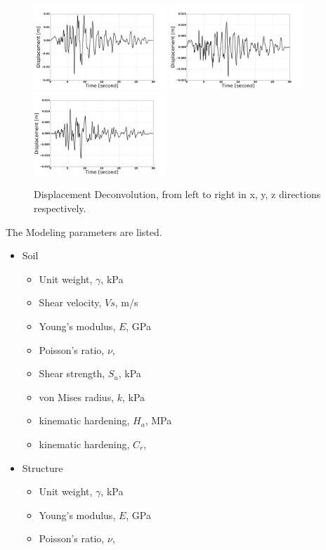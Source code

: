 \begin{figure}[H]
  \centering
  \includegraphics[width = 5cm]{./Figure-files/Day1/Nuclear_Power_Plant_with_3by1D_motions_from_Deconvolution/scaled_NORTHR_x_D.jpg}
  \includegraphics[width = 5cm]{./Figure-files/Day1/Nuclear_Power_Plant_with_3by1D_motions_from_Deconvolution/scaled_NORTHR_y_D.jpg}
  \includegraphics[width = 5cm]{./Figure-files/Day1/Nuclear_Power_Plant_with_3by1D_motions_from_Deconvolution/scaled_NORTHR_z_D.jpg}
  \caption{Displacement Deconvolution, from left to right in x, y, z directions respectively. }
  \label{fig_motion_deconvolution3}
\end{figure}


The Modeling parameters are listed.
\begin{itemize}
  \item Soil 
  \begin{itemize}
    \item Unit weight, $\gamma$, \enspace {} kPa
    \item Shear velocity, $Vs$, \enspace {} m/s
    \item Young's modulus, $E$, \enspace {} GPa
    \item Poisson's ratio, $\nu$, \enspace {}
    \item Shear strength, $S_u$, \enspace {} kPa
    \item von Mises radius, $k$, \enspace {} kPa
    \item kinematic hardening, $H_a$, \enspace {} MPa
    \item kinematic hardening, $C_r$, \enspace {}
  \end{itemize}
  \item Structure
  \begin{itemize}
    \item Unit weight, $\gamma$, \enspace {} kPa
    \item Young's modulus, $E$, \enspace {} GPa
    \item Poisson's ratio, $\nu$, \enspace {}
  \end{itemize}
\end{itemize}

